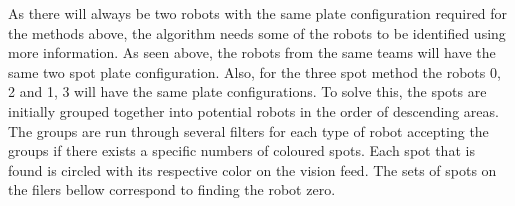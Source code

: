 \documentclass[a4paper,12pt]{article}
\begin{document}
\medskip

As there will always be two robots with the same plate configuration required for the methods above, the algorithm needs some of the robots to be identified using more information. As seen above, the robots from the same teams will have the same two spot plate configuration. Also, for the three spot method the robots 0, 2 and 1, 3 will have the same plate configurations. To solve this, the spots are initially grouped together into potential robots in the order of descending areas. The groups are run through several filters for each type of robot accepting the groups if there exists a specific numbers of coloured spots. Each spot that is found is circled with its respective color on the vision feed. The sets of spots on the filers bellow correspond to finding the robot zero.

\medskip
\end{document}
